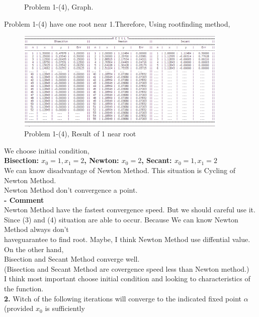 \documentclass[10pt]{article}
\begin{document}
\begin{flushleft}
\begin{figure}[!h]
\begin{center}
		\caption{Problem 1-(4), Graph.}
		\end{center}
	\end{figure}
	\qquad \quad Problem 1-(4) have one root near 1.Therefore, Using rootfinding method,\\
	\begin{figure}[!h]
		\centering
		\begin{center}
		\includegraphics[width=0.9\textwidth]{1-4-r.png}
		\caption{Problem 1-(4), Result of 1 near root }
		\end{center}
	\end{figure}
	\qquad \quad We choose initial condition,\\
	\qquad \qquad \qquad \qquad \qquad \textbf{Bisection: $x_0=1,x_1=2$, Newton: $x_0=2$, Secant: $x_0=1,x_1=2$}\\
	\qquad \quad We can know disadvantage of Newton Method. This situation is Cycling of Newton Method.\\
	\qquad \quad Newton Method don't convergence a point.\\
	\;\;\;
	\qquad \quad \textbf{- Comment}\\
	\qquad \qquad Newton Method have the fastest convergence speed. But we should careful use it.\\
	\qquad \qquad Since (3) and (4) situation are able to occur. Because We can know Newton Method always don't\\
	\qquad \qquad haveguarantee to find root. Maybe, I think Newton Method use diffential value. On the other hand, \\
	\qquad \qquad Bisection and Secant Method converge well.\\
	\qquad \qquad(Bisection and Secant Method are covergence speed less than Newton method.)\\
	\qquad \qquad I think most important choose initial condition and looking to characteristics of the function.\\
	\;\;\;\;\;\;\newpage
	\textbf{2.} Witch of the following iterations will converge to the indicated fixed point $\alpha$ (provided $x_0$ is sufficiently\\

\end{flushleft}
\end{document}
